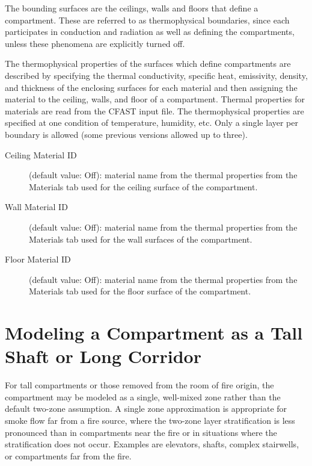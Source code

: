 The bounding surfaces are the ceilings, walls and floors that define a compartment. These are referred to as thermophysical boundaries, since each participates in conduction and radiation as well as defining the compartments, unless these phenomena are explicitly turned off.

The thermophysical properties of the surfaces which define compartments are described by specifying the thermal conductivity, specific heat, emissivity, density, and thickness of the enclosing surfaces for each material and then assigning the material to the ceiling, walls, and floor of a compartment.  Thermal properties for materials are read from the CFAST input file.  The thermophysical properties are specified at one condition of temperature, humidity, etc.  Only a single layer per boundary is allowed (some previous versions allowed up to three).

\begin{description}
\item[Ceiling Material ID] (default value: Off): material name from the thermal properties from the Materials tab used for the ceiling surface of the compartment.

\item[Wall Material ID] (default value: Off): material name from the thermal properties from the Materials tab used for the wall surfaces of the compartment.

\item[Floor Material ID] (default value: Off): material name from the thermal properties from the Materials tab used for the floor surface of the compartment.
\end{description}





\section{Modeling a Compartment as a Tall Shaft or Long Corridor}
\label{info:COMP3}
For tall compartments or those removed from the room of fire origin, the compartment may be modeled as a single, well-mixed zone rather than the default two-zone assumption. A single zone approximation is appropriate for smoke flow far from a fire source, where the two-zone layer stratification is less pronounced than in compartments near the fire or in situations where the stratification does not occur. Examples are elevators, shafts, complex stairwells, or compartments far from the fire.

